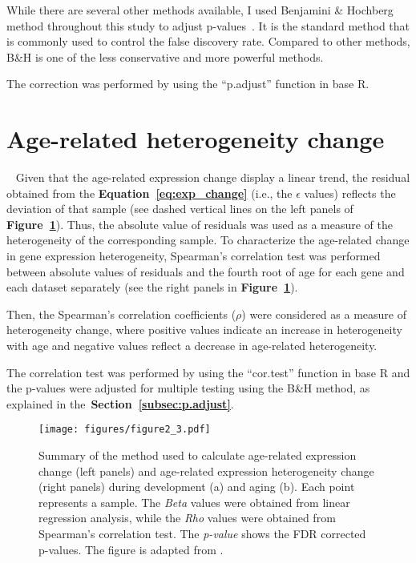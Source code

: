While there are several other methods available, I used Benjamini {\&} Hochberg method throughout this study to adjust p-values~\autocite{Benjamin1995}.
It is the standard method that is commonly used to control the false discovery rate. 
Compared to other methods, B{\&}H is one of the less conservative and more powerful methods.

The correction was performed by using the ``p.adjust'' function in base R.

\section{Age-related heterogeneity change}~\label{sec:het-change}
Given that the age-related expression change display a linear trend, the residual obtained from the \textbf{Equation~\ref{eq:exp_change}} (i.e., the $\epsilon$ values)
reflects the deviation of that sample (see dashed vertical lines on the left panels of \textbf{Figure~\ref{fig:fig2.3}}).
Thus, the absolute value of residuals was used as a measure of the heterogeneity of the corresponding sample. 
To characterize the age-related change in gene expression heterogeneity,
Spearman's correlation test was performed between absolute values of residuals and 
the fourth root of age for each gene and each dataset separately (see the right panels in \textbf{Figure~\ref{fig:fig2.3}}).

Then, the Spearman's correlation coefficients ($\rho$) were considered as a measure of heterogeneity change, 
where positive values indicate an increase in heterogeneity with age and negative values reflect a decrease in age-related heterogeneity. 

The correlation test was performed by using the ``cor.test'' function in base R and the p-values were adjusted for multiple testing using the B{\&}H method, 
as explained in the~\textbf{Section~\ref{subsec:p.adjust}}.

\begin{figure}[!ht]
\centering
\texttt{[image: figures/figure2\_3.pdf]}
\caption{Summary of the method used to calculate age-related expression change (left panels) 
and age-related expression heterogeneity change (right panels) during development (a) and aging (b). 
Each point represents a sample.
The \textit{Beta} values were obtained from linear regression analysis, while the \textit{Rho} values were obtained from Spearman's correlation test. 
The \textit{p-value} shows the FDR corrected p-values. 
The figure is adapted from \autocite{Isildak2020}.}\label{fig:fig2.3}
\end{figure}

